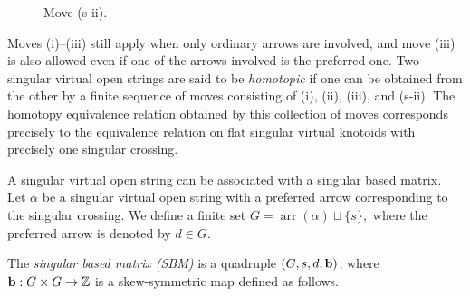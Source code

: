 \documentclass[12pt]{amsart}
\theoremstyle{noparens}
\numberwithin{equation}{section}
\numberwithin{equation}{section}
\begin{document}
\begin{figure}[htbp]
\begin{center}
		\caption{Move (s-ii).}\label{fig531}
	\end{center}
\end{figure}

Moves (i)--(iii) still apply when only ordinary arrows are involved, and move (iii) is also allowed even if one of the arrows involved is the preferred one.
Two singular virtual open strings are said to be \textit{homotopic} if one can be obtained from the other by a finite sequence of moves consisting of (i), (ii), (iii), and (s-ii).
The homotopy equivalence relation obtained by this
collection of moves corresponds precisely to the equivalence relation on flat singular virtual knotoids with precisely one singular crossing.

A singular virtual open string can be associated with a singular based matrix. Let $\alpha$ be a singular virtual open string with a preferred arrow corresponding to the singular crossing. We define a finite set 
$G = \operatorname{arr}(\alpha) \sqcup \{s\},$
where the preferred arrow is denoted by $d \in G$.

The \textit{singular based matrix (SBM)} is a quadruple $(G, s, d, {\bf b})$, where ${\bf b}: G \times G \to \mathbb{Z}$ is a skew-symmetric map defined as follows.
\end{document}
